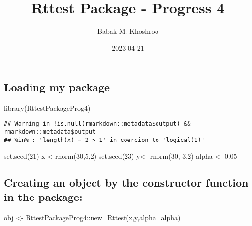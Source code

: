 \documentclass[
]{article}
\title{Rttest Package - Progress 4}
\author{Babak M. Khoshroo}
\date{2023-04-21}
\newenvironment{Shaded}{\begin{snugshade}}{\end{snugshade}}
\newcommand{\AttributeTok}[1]{\textcolor[rgb]{0.77,0.63,0.00}{#1}}
\newcommand{\DecValTok}[1]{\textcolor[rgb]{0.00,0.00,0.81}{#1}}
\newcommand{\FloatTok}[1]{\textcolor[rgb]{0.00,0.00,0.81}{#1}}
\newcommand{\FunctionTok}[1]{\textcolor[rgb]{0.00,0.00,0.00}{#1}}
\newcommand{\NormalTok}[1]{#1}
\newcommand{\OtherTok}[1]{\textcolor[rgb]{0.56,0.35,0.01}{#1}}
\newcommand{\SpecialCharTok}[1]{\textcolor[rgb]{0.00,0.00,0.00}{#1}}
\begin{document}
\maketitle

\hypertarget{loading-my-package}{%
\subsection{Loading my package}\label{loading-my-package}}

\begin{Shaded}
\begin{Highlighting}[]
\FunctionTok{library}\NormalTok{(RttestPackageProg4)}
\end{Highlighting}
\end{Shaded}

\begin{verbatim}
## Warning in !is.null(rmarkdown::metadata$output) && rmarkdown::metadata$output
## %in% : 'length(x) = 2 > 1' in coercion to 'logical(1)'
\end{verbatim}

\begin{Shaded}
\begin{Highlighting}[]
\FunctionTok{set.seed}\NormalTok{(}\DecValTok{21}\NormalTok{)}
\NormalTok{x }\OtherTok{\textless{}{-}}\FunctionTok{rnorm}\NormalTok{(}\DecValTok{30}\NormalTok{,}\DecValTok{5}\NormalTok{,}\DecValTok{2}\NormalTok{)}
\FunctionTok{set.seed}\NormalTok{(}\DecValTok{23}\NormalTok{)}
\NormalTok{y}\OtherTok{\textless{}{-}} \FunctionTok{rnorm}\NormalTok{(}\DecValTok{30}\NormalTok{, }\DecValTok{3}\NormalTok{,}\DecValTok{2}\NormalTok{)}
\NormalTok{alpha }\OtherTok{\textless{}{-}} \FloatTok{0.05}
\end{Highlighting}
\end{Shaded}

\hypertarget{creating-an-object-by-the-constructor-function-in-the-package}{%
\subsection{Creating an object by the constructor function in the
package:}\label{creating-an-object-by-the-constructor-function-in-the-package}}

\begin{Shaded}
\begin{Highlighting}[]
\NormalTok{obj }\OtherTok{\textless{}{-}}\NormalTok{ RttestPackageProg4}\SpecialCharTok{::}\FunctionTok{new\_Rttest}\NormalTok{(x,y,}\AttributeTok{alpha=}\NormalTok{alpha)}
\end{Highlighting}
\end{Shaded}
\end{document}
